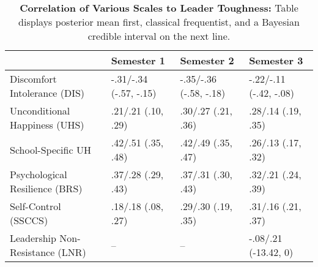 \begin{table}[ht]
\centering
\begin{tabular}{llll}
  \hline
 & Semester 1 & Semester 2 & Semester 3 \\ 
  \hline
Discomfort Intolerance (DIS) & -.31/-.34 (-.57, -.15) & -.35/-.36 (-.58, -.18) & -.22/-.11 (-.42, -.08) \\ 
  Unconditional Happiness (UHS) & .21/.21 (.10, .29) & .30/.27 (.21, .36) & .28/.14 (.19, .35) \\ 
  School-Specific UH & .42/.51 (.35, .48) & .42/.49 (.35, .47) & .26/.13 (.17, .32) \\ 
  Psychological Resilience (BRS) & .37/.28 (.29, .43) & .37/.31 (.30, .43) & .32/.21 (.24, .39) \\ 
  Self-Control (SSCCS) & .18/.18 (.08, .27) & .29/.30 (.19, .35) & .31/.16 (.21, .37) \\ 
  Leadership Non-Resistance (LNR) & -- & -- & -.08/.21 (-13.42, 0) \\ 
   \hline
\end{tabular}
\caption{\textbf{Correlation of Various Scales to Leader Toughness:} Table displays posterior mean first, classical frequentist, and a Bayesian credible interval on the next line.} 
\label{tab:edc_corr}
\end{table}
